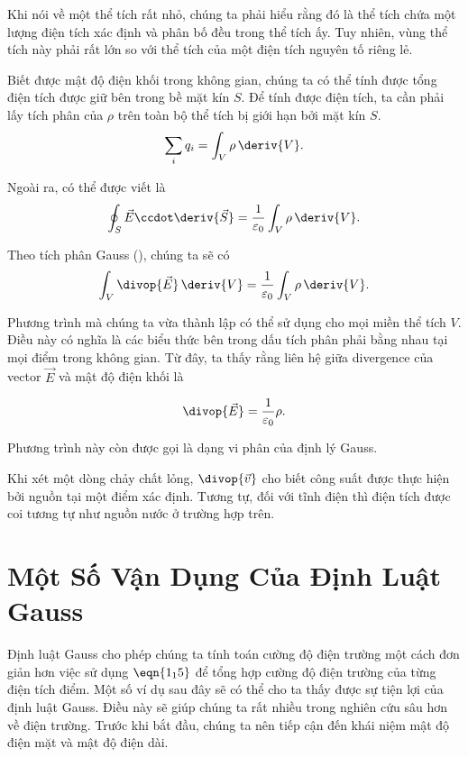 \noindent
Khi nói về một thể tích rất nhỏ, chúng ta phải hiểu rằng đó là thể tích chứa một lượng điện tích xác định và phân bố đều trong thể tích ấy. Tuy nhiên, vùng thể tích này phải rất lớn so với thể tích của một điện tích nguyên tố riêng lẻ.

Biết được mật độ điện khối trong không gian, chúng ta có thể tính được tổng điện tích được giữ bên trong bề mặt kín $S$. Để tính được điện tích, ta cần phải lấy tích phân của $\rho$ trên toàn bộ thể tích bị giới hạn bởi mặt kín $S$.
\begin{equation*}
	\sum_i q_i = \int_V \rho\,\deriv{V}.
\end{equation*}

\noindent
Ngoài ra,  có thể được viết là
\begin{equation}\label{eq:1_116}
	\oint_S \vec{E}\ccdot\deriv{\vec{S}} = \frac{1}{\varepsilon_0} \int_V \rho\,\deriv{V}.
\end{equation}

Theo tích phân Gauss (), chúng ta sẽ có
\begin{equation*}
	\int_V \divop{\vec{E}}\,\deriv{V} = \frac{1}{\varepsilon_0} \int_V \rho\,\deriv{V}.
\end{equation*}

\noindent
Phương trình mà chúng ta vừa thành lập có thể sử dụng cho mọi miền thể tích $V$. Điều này có nghĩa là các biểu thức bên trong dấu tích phân phải bằng nhau tại mọi điểm trong không gian. Từ đây, ta thấy rằng liên hệ giữa divergence của vector $\vec{E}$ và mật độ điện khối là

\begin{equation}\label{eq:1_117}
	\divop{\vec{E}} = \frac{1}{\varepsilon_0} \rho.
\end{equation}

\noindent
Phương trình này còn được gọi là dạng vi phân của định lý Gauss.

Khi xét một dòng chảy chất lỏng, $\divop{\vec{v}}$ cho biết công suất được thực hiện bởi nguồn tại một điểm xác định. Tương tự, đối với tĩnh điện thì điện tích được coi tương tự như nguồn nước ở trường hợp trên. 

\section{Một Số Vận Dụng Của Định Luật Gauss }\label{sec:1_14}

Định luật Gauss cho phép chúng ta tính toán cường độ điện trường một cách đơn giản hơn việc sử dụng $\eqn{1_15}$ để tổng hợp cường độ điện trường của từng điện tích điểm. Một số ví dụ sau đây sẽ có thể cho ta thấy được sự tiện lợi của định luật Gauss. Điều này sẽ giúp chúng ta rất nhiều trong nghiên cứu sâu hơn về điện trường. Trước khi bắt đầu, chúng ta nên tiếp cận đến khái niệm mật độ điện mặt và mật độ điện dài.


